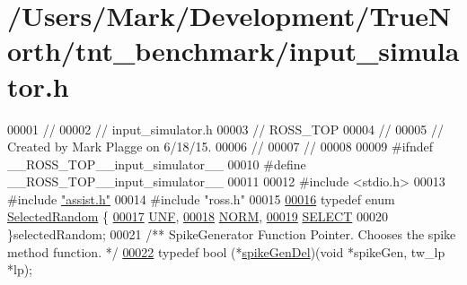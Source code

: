 \hypertarget{input__simulator_8h_source}{}\section{/\+Users/\+Mark/\+Development/\+True\+North/tnt\+\_\+benchmark/input\+\_\+simulator.h}

\begin{DoxyCode}
00001 \textcolor{comment}{//}
00002 \textcolor{comment}{//  input\_simulator.h}
00003 \textcolor{comment}{//  ROSS\_TOP}
00004 \textcolor{comment}{//}
00005 \textcolor{comment}{//  Created by Mark Plagge on 6/18/15.}
00006 \textcolor{comment}{//}
00007 \textcolor{comment}{//}
00008 
00009 \textcolor{preprocessor}{#}\textcolor{preprocessor}{ifndef} \textcolor{preprocessor}{\_\_ROSS\_TOP\_\_input\_simulator\_\_}
00010 \textcolor{preprocessor}{#}\textcolor{preprocessor}{define} \textcolor{preprocessor}{\_\_ROSS\_TOP\_\_input\_simulator\_\_}
00011 
00012 \textcolor{preprocessor}{#}\textcolor{preprocessor}{include} \textcolor{preprocessor}{<}\textcolor{preprocessor}{stdio}\textcolor{preprocessor}{.}\textcolor{preprocessor}{h}\textcolor{preprocessor}{>}
00013 \textcolor{preprocessor}{#}\textcolor{preprocessor}{include} \hyperlink{assist_8h}{"assist.h"}
00014 \textcolor{preprocessor}{#}\textcolor{preprocessor}{include} \textcolor{preprocessor}{"ross.h"}
00015 
\hypertarget{input__simulator_8h_source_l00016}{}\hyperlink{input__simulator_8h_aa0d25534cd73156287b1136dd89c0215}{00016} \textcolor{keyword}{typedef} \textcolor{keyword}{enum} \hyperlink{input__simulator_8h_aa0d25534cd73156287b1136dd89c0215}{SelectedRandom} \{
\hypertarget{input__simulator_8h_source_l00017}{}\hyperlink{input__simulator_8h_aa0d25534cd73156287b1136dd89c0215a4b3574e75cec43aa4dd3a0fd7940c632}{00017}     \hyperlink{input__simulator_8h_aa0d25534cd73156287b1136dd89c0215a4b3574e75cec43aa4dd3a0fd7940c632}{UNF},
\hypertarget{input__simulator_8h_source_l00018}{}\hyperlink{input__simulator_8h_aa0d25534cd73156287b1136dd89c0215ae003ec1158e3a4e295616ced12af154e}{00018}     \hyperlink{input__simulator_8h_aa0d25534cd73156287b1136dd89c0215ae003ec1158e3a4e295616ced12af154e}{NORM},
\hypertarget{input__simulator_8h_source_l00019}{}\hyperlink{input__simulator_8h_aa0d25534cd73156287b1136dd89c0215a1697a91b22c2369eb2ba427c2d193329}{00019}     \hyperlink{input__simulator_8h_aa0d25534cd73156287b1136dd89c0215a1697a91b22c2369eb2ba427c2d193329}{SELECT}
00020 \}selectedRandom;
00021 \textcolor{comment}{/** SpikeGenerator Function Pointer. Chooses the spike method function. */}
\hypertarget{input__simulator_8h_source_l00022}{}\hyperlink{input__simulator_8h_aa47e87d309aab7727810011578bae86e}{00022} \textcolor{keyword}{typedef} \textcolor{keywordtype}{bool} (*\hyperlink{input__simulator_8h_aa47e87d309aab7727810011578bae86e}{spikeGenDel})(\textcolor{keywordtype}{void} *spikeGen, tw\_lp *lp);

\end{DoxyCode}
